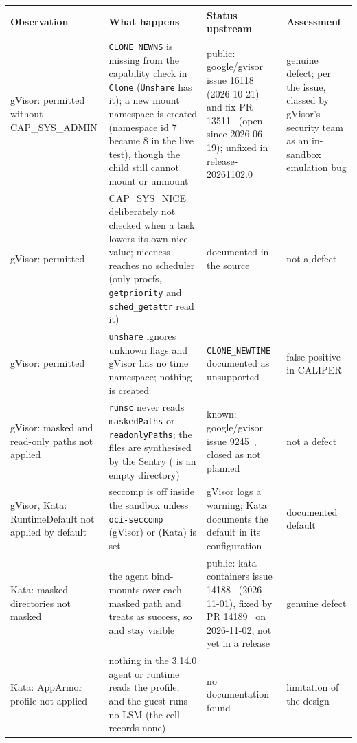 \begin{table}[htbp]
\centering\footnotesize
\begin{tabularx}{\textwidth}{@{}P{3.1cm}LP{3.1cm}P{2.2cm}@{}}
\toprule
\textbf{Observation} & \textbf{What happens} & \textbf{Status upstream} & \textbf{Assessment} \\
\midrule
gVisor:  permitted without CAP\_SYS\_ADMIN & \texttt{CLONE\_NEWNS} is missing from the capability check in \texttt{Clone} (\texttt{Unshare} has it); a new mount namespace is created (namespace id 7 became 8 in the live test), though the child still cannot mount or unmount & public: google/gvisor issue 16118~\cite{gvisor16118} (2026-10-21) and fix PR 13511~\cite{gvisor13511} (open since 2026-06-19); unfixed in release-20261102.0 & genuine defect; per the issue, classed by gVisor's security team as an in-sandbox emulation bug \\
gVisor:  permitted & CAP\_SYS\_NICE deliberately not checked when a task lowers its own nice value; niceness reaches no scheduler (only procfs, \texttt{getpriority} and \texttt{sched\_getattr} read it) & documented in the source & not a defect \\
gVisor:  permitted & \texttt{unshare} ignores unknown flags and gVisor has no time namespace; nothing is created & \texttt{CLONE\_NEWTIME} documented as unsupported & false positive in CALIPER \\
gVisor: masked and read-only paths not applied & \texttt{runsc} never reads \texttt{maskedPaths} or \texttt{readonlyPaths}; the files are synthesised by the Sentry ( is an empty directory) & known: google/gvisor issue 9245~\cite{gvisor9245}, closed as not planned & not a defect \\
gVisor, Kata: RuntimeDefault not applied by default & seccomp is off inside the sandbox unless \texttt{oci-seccomp} (gVisor) or  (Kata) is set & gVisor logs a warning; Kata documents the default in its configuration & documented default \\
Kata: masked directories not masked & the agent bind-mounts  over each masked path and treats  as success, so  and  stay visible & public: kata-containers issue 14188~\cite{kata14188} (2026-11-01), fixed by PR 14189~\cite{kata14189} on 2026-11-02, not yet in a release & genuine defect \\
Kata: AppArmor profile not applied & nothing in the 3.14.0 agent or runtime reads the profile, and the guest runs no LSM (the cell records none) & no documentation found & limitation of the design \\

\end{tabularx}
\end{table}
